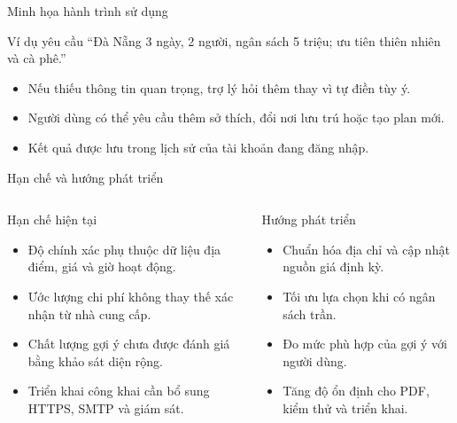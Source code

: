 \documentclass[aspectratio=169,11pt]{beamer}
\begin{document}
\begin{frame}{Minh họa hành trình sử dụng}
  \begin{center}
  \end{center}
  \vspace{0.55cm}
  \begin{block}{Ví dụ yêu cầu}
    “Đà Nẵng 3 ngày, 2 người, ngân sách 5 triệu; ưu tiên thiên nhiên và cà phê.”
  \end{block}
  \begin{itemize}
    \item Nếu thiếu thông tin quan trọng, trợ lý hỏi thêm thay vì tự điền tùy ý.
    \item Người dùng có thể yêu cầu thêm sở thích, đổi nơi lưu trú hoặc tạo plan mới.
    \item Kết quả được lưu trong lịch sử của tài khoản đang đăng nhập.
  \end{itemize}
\end{frame}

\begin{frame}{Hạn chế và hướng phát triển}
  \begin{columns}[T,onlytextwidth]
      \begin{block}{Hạn chế hiện tại}
        \begin{itemize}
          \item Độ chính xác phụ thuộc dữ liệu địa điểm, giá và giờ hoạt động.
          \item Ước lượng chi phí không thay thế xác nhận từ nhà cung cấp.
          \item Chất lượng gợi ý chưa được đánh giá bằng khảo sát diện rộng.
          \item Triển khai công khai cần bổ sung HTTPS, SMTP và giám sát.
        \end{itemize}
      \end{block}
      \begin{block}{Hướng phát triển}
        \begin{itemize}
          \item Chuẩn hóa địa chỉ và cập nhật nguồn giá định kỳ.
          \item Tối ưu lựa chọn khi có ngân sách trần.
          \item Đo mức phù hợp của gợi ý với người dùng.
          \item Tăng độ ổn định cho PDF, kiểm thử và triển khai.
        \end{itemize}
      \end{block}
  \end{columns}
\end{frame}
\end{document}
